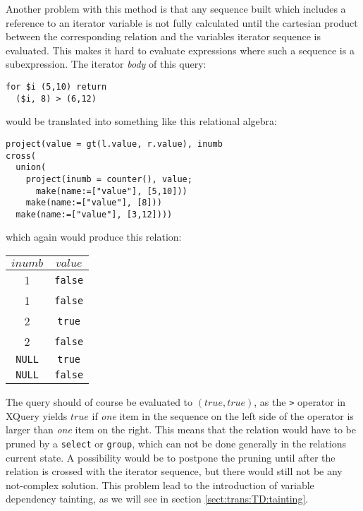 Another problem with this method is that any sequence built which includes a reference to an iterator variable is
not fully calculated until the cartesian product between the corresponding relation and the variables iterator
sequence is evaluated. This makes it hard to evaluate expressions where such a sequence is a subexpression. The
iterator \textit{body} of this query:

\begin{Verbatim}
for $i (5,10) return
  ($i, 8) > (6,12)
\end{Verbatim}
would be translated into something like this relational algebra:
\begin{Verbatim}
project(value = gt(l.value, r.value), inumb
cross(
  union(
    project(inumb = counter(), value;
      make(name:=["value"], [5,10]))
    make(name:=["value"], [8]))
  make(name:=["value"], [3,12])))
\end{Verbatim}
which again would produce this relation:

\begin{figure*}[!h]
\centering
\begin{tabular}{|c|c|} \hline
$inumb$ & $value$ \\\hline
1 & \texttt{false} \\\hline
1 & \texttt{false} \\\hline
2 & \texttt{true} \\\hline
2 & \texttt{false} \\\hline
\texttt{NULL} & \texttt{true} \\\hline
\texttt{NULL} & \texttt{false} \\\hline
\end{tabular}
\end{figure*}

The query should of course be evaluated to $(true, true)$, as the \texttt{>} operator in XQuery yields $true$ if
\textit{one} item in the sequence on the left side of the operator is larger than \textit{one} item on the right.
This means that the relation would have to be pruned by a \texttt{select} or \texttt{group}, which can not be done
generally in the relations current state. A possibility would be to postpone the pruning until after the relation
is crossed with the iterator sequence, but there would still not be any not-complex solution. This problem lead to
the introduction of variable dependency tainting, as we will see in section \ref{sect:trans:TD:tainting}.
